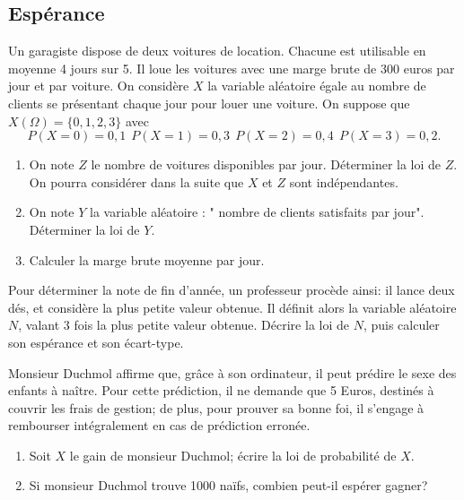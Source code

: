 \documentclass{book}
\begin{document}
\subsection*{Espérance}
\begin{Exercice}[Garagiste]
Un garagiste dispose de deux voitures de location. Chacune est utilisable en moyenne 4 jours sur 5. Il loue les voitures avec une marge brute de 300 euros par jour et par voiture.
On considère $X$ la variable aléatoire égale au nombre de clients se présentant chaque jour pour louer une voiture. On suppose que $X(\Omega)=\{0,1,2,3\}$ avec 
$$P(X=0)=0,1\ \ P(X=1)=0,3\ \ P(X=2)=0,4\ \ P(X=3)=0,2.$$
\begin{enumerate}
\item On note $Z$ le nombre de voitures disponibles par jour. Déterminer la loi de $Z$. On pourra considérer dans la suite que $X$ et $Z$ sont indépendantes.
\item On note $Y$ la variable aléatoire : " nombre de clients satisfaits par jour". Déterminer la loi de $Y$.
\item Calculer la marge brute moyenne par jour.
\end{enumerate}
\end{Exercice}
\begin{Exercice}[Note]
Pour déterminer la note de fin d'année, un professeur procède ainsi:
il lance deux dés, et considère la plus petite valeur obtenue.
Il définit alors la variable aléatoire $N$, valant $3$ fois la
plus petite valeur obtenue.
Décrire la loi de $N$, puis calculer son espérance et son écart-type.
\end{Exercice}
\begin{Exercice}[Arnaque]
Monsieur Duchmol affirme que, grâce à son ordinateur, il peut prédire
le sexe des enfants à naître. Pour cette prédiction, il ne demande que
5 Euros, destinés à couvrir les frais de gestion; de plus, pour
\og{}prouver\fg{} sa bonne foi, il s'engage à rembourser intégralement
en cas de prédiction erronée.
\begin{enumerate}
\item
  Soit $X$ le gain de monsieur Duchmol; écrire la loi de probabilité de $X$.
\item
  Si monsieur Duchmol trouve 1000 naïfs, combien peut-il espérer gagner?
\end{enumerate}
\end{Exercice}
\end{document}
